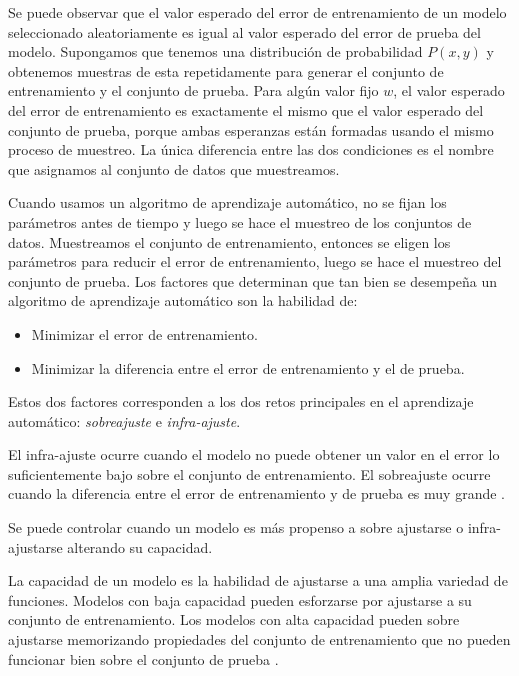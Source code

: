 Se puede observar que el valor esperado del error de entrenamiento de un
modelo seleccionado aleatoriamente es igual al valor esperado del error
de prueba del modelo. Supongamos que tenemos una distribución de
probabilidad $P(x, y)$ y obtenemos muestras de esta repetidamente para
generar el conjunto de entrenamiento y el conjunto de prueba. Para algún
valor fijo $w$, el valor esperado del error de entrenamiento es
exactamente el mismo que el valor esperado del conjunto de prueba,
porque ambas esperanzas están formadas usando el mismo proceso de
muestreo. La única diferencia entre las dos condiciones es el nombre que
asignamos al conjunto de datos que muestreamos.

Cuando usamos un algoritmo de aprendizaje automático, no
se fijan los parámetros antes de tiempo y luego se hace el muestreo de
los conjuntos de datos. Muestreamos el conjunto de entrenamiento,
entonces se eligen los parámetros para reducir el error de
entrenamiento, luego se hace el muestreo del conjunto de prueba. Los
factores que determinan que tan bien se desempeña un algoritmo de
aprendizaje automático son la habilidad de:

\begin{itemize}
    \item Minimizar el error de entrenamiento.
    \item Minimizar la diferencia entre el error de entrenamiento y el de prueba.
\end{itemize}



Estos dos factores corresponden a los dos retos principales en el
aprendizaje automático: \textit{sobreajuste} e \textit{infra-ajuste}.\\ 

\begin{remark}
El infra-ajuste
ocurre cuando el modelo no puede obtener un valor en el error lo
suficientemente bajo sobre el conjunto de entrenamiento. El sobreajuste
ocurre cuando la diferencia entre el error de entrenamiento y de prueba
es muy grande \cite{iangoodfellowyoshuabengioaaroncourville2017}.
\end{remark}


Se puede controlar cuando un modelo es más propenso a sobre ajustarse o
infra-ajustarse alterando su capacidad.\\

\begin{remark}
La capacidad de un
modelo es la habilidad de ajustarse a una amplia variedad de funciones.
Modelos con baja capacidad pueden esforzarse por ajustarse a su conjunto
de entrenamiento. Los modelos con alta capacidad pueden sobre ajustarse
memorizando propiedades del conjunto de entrenamiento que no pueden
funcionar bien sobre el conjunto de prueba \cite{iangoodfellowyoshuabengioaaroncourville2017}.
\end{remark}


